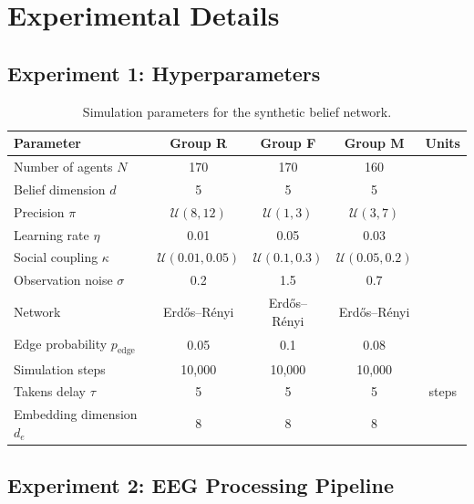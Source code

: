 \documentclass[11pt,a4paper]{article}
\theoremstyle{definition}
\begin{document}
\section{Experimental Details}
\label{app:exp_details}

\subsection{Experiment 1: Hyperparameters}

\begin{table}[h]
\centering
\caption{Simulation parameters for the synthetic belief network.}
\begin{tabular}{@{}lcccc@{}}
\toprule
Parameter & Group R & Group F & Group M & Units \\
\midrule
Number of agents $N$ & 170 & 170 & 160 & \\
Belief dimension $d$ & 5 & 5 & 5 & \\
Precision $\pi$ & $\mathcal{U}(8, 12)$ & $\mathcal{U}(1, 3)$ & $\mathcal{U}(3, 7)$ & \\
Learning rate $\eta$ & 0.01 & 0.05 & 0.03 & \\
Social coupling $\kappa$ & $\mathcal{U}(0.01, 0.05)$ & $\mathcal{U}(0.1, 0.3)$ & $\mathcal{U}(0.05, 0.2)$ & \\
Observation noise $\sigma$ & 0.2 & 1.5 & 0.7 & \\
Network & Erd\H{o}s--R\'{e}nyi & Erd\H{o}s--R\'{e}nyi & Erd\H{o}s--R\'{e}nyi & \\
Edge probability $p_{\mathrm{edge}}$ & 0.05 & 0.1 & 0.08 & \\
Simulation steps & 10,000 & 10,000 & 10,000 & \\
Takens delay $\tau$ & 5 & 5 & 5 & steps \\
Embedding dimension $d_e$ & 8 & 8 & 8 & \\
\bottomrule
\end{tabular}
\end{table}

\subsection{Experiment 2: EEG Processing Pipeline}
\end{document}
